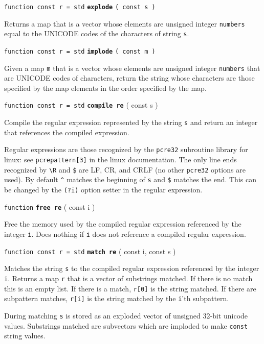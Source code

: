 \documentclass[12pt]{article}
\newcommand{\ttkey}[1]{{\tt \bfseries #1}}
\newenvironment{indpar}[1][0.3in]%
	{\begin{list}{}%
		     {\setlength{\itemsep}{0in}%
		      \setlength{\topsep}{0in}%
		      \setlength{\parsep}{1ex}%
		      \setlength{\labelwidth}{#1}%
		      \setlength{\leftmargin}{#1}%
		      \addtolength{\leftmargin}{\labelsep}}%
	 \item}%
	{\end{list}}
\begin{document}
{\tt function const r = std} \ttkey{explode} {\tt ( const s )}
\begin{indpar}
Returns a map that is a vector whose elements are unsigned integer {\tt numbers}
equal to the UNICODE codes of the characters of string {\tt s}.
\end{indpar}

{\tt function const r = std} \ttkey{implode} {\tt ( const m )}
\begin{indpar}
Given a map {\tt m} that is a vector whose elements are unsigned integer
{\tt numbers}
that are UNICODE codes of characters, return the string whose characters
are those specified by the map elements in the order specified by the map.
\end{indpar}

{\tt function const r = std} \ttkey{compile re} ( const s )
\begin{indpar}
Compile the regular expression represented by the string {\tt s}
and return an integer that references the compiled expression.

Regular expressions are those recognized by the {\tt pcre32}
subroutine library for linux: see {\tt pcrepattern[3]} in
the linux documentation.  The only line ends recognized
by {\tt \textbackslash R} and {\tt \$} are LF, CR, and CRLF (no other
{\tt pcre32} options are used).  By default {\tt \textasciicircum}
matches the beginning of {\tt s} and {\tt \$} matches the end.
This can be changed by the {\tt (?i)} option setter in the
regular expression.
\end{indpar}

{\tt function} \ttkey{free re} ( const i )
\begin{indpar}
Free the memory used by the compiled regular expression
referenced by the integer {\tt i}.  Does nothing if {\tt i}
does not reference a compiled regular expression.
\end{indpar}

{\tt function const r = std} \ttkey{match re} ( const i, const s  )
\begin{indpar}
Matches the string {\tt s} to the compiled regular expression
referenced by the integer {\tt i}.
Returns a map {\tt r} that is a vector of substrings matched.
If there is no match this is an empty list.  If there is
a match, {\tt r[0]} is the string matched.  If there are
subpattern matches, {\tt r[i]} is the string matched by the
{\tt i}'th subpattern.

During matching {\tt s} is stored as an exploded vector of
unsigned 32-bit unicode values.  Substrings matched are
subvectors which are imploded to make {\tt const} string values.
\end{indpar}
\end{document}
